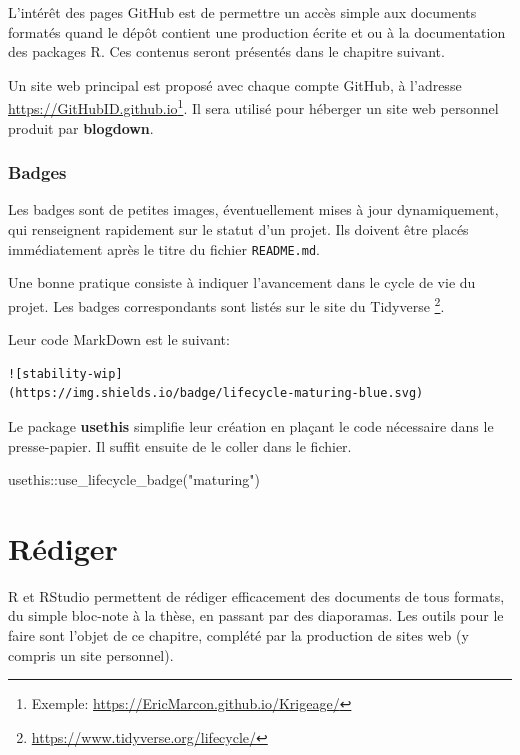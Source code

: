 \documentclass[
  11pt,
  french,
  a4paper,
  extrafontsizes,onecolumn,openright
  ]{memoir}
\newenvironment{Shaded}{\begin{snugshade}}{\end{snugshade}}
\newcommand{\FunctionTok}[1]{\textcolor[rgb]{0.00,0.00,0.00}{#1}}
\newcommand{\NormalTok}[1]{#1}
\newcommand{\SpecialCharTok}[1]{\textcolor[rgb]{0.00,0.00,0.00}{#1}}
\newcommand{\StringTok}[1]{\textcolor[rgb]{0.31,0.60,0.02}{#1}}
\begin{document}
L'intérêt des pages GitHub est de permettre un accès simple aux documents formatés quand le dépôt contient une production écrite et ou à la documentation des packages R.
Ces contenus seront présentés dans le chapitre suivant.

Un site web principal est proposé avec chaque compte GitHub, à l'adresse \url{https://GitHubID.github.io}\footnote{Exemple: \url{https://EricMarcon.github.io/Krigeage/}}.
Il sera utilisé pour héberger un site web personnel produit par \textbf{blogdown}.

\hypertarget{badges}{%
\subsection{Badges}\label{badges}}

Les badges sont de petites images, éventuellement mises à jour dynamiquement, qui renseignent rapidement sur le statut d'un projet.
Ils doivent être placés immédiatement après le titre du fichier \texttt{README.md}.

Une bonne pratique consiste à indiquer l'avancement dans le cycle de vie du projet.
Les badges correspondants sont listés sur le site du Tidyverse \footnote{\url{https://www.tidyverse.org/lifecycle/}}.

Leur code MarkDown est le suivant:

\begin{verbatim}
![stability-wip]
(https://img.shields.io/badge/lifecycle-maturing-blue.svg)
\end{verbatim}

Le package \textbf{usethis} simplifie leur création en plaçant le code nécessaire dans le presse-papier.
Il suffit ensuite de le coller dans le fichier.

\scriptsize

\begin{Shaded}
\begin{Highlighting}[]
\NormalTok{usethis}\SpecialCharTok{::}\FunctionTok{use\_lifecycle\_badge}\NormalTok{(}\StringTok{"maturing"}\NormalTok{)}
\end{Highlighting}
\end{Shaded}

\normalsize

\hypertarget{chap:rediger}{%
\chapter{Rédiger}\label{chap:rediger}}

R et RStudio permettent de rédiger efficacement des documents de tous formats, du simple bloc-note à la thèse, en passant par des diaporamas.
Les outils pour le faire sont l'objet de ce chapitre, complété par la production de sites web (y compris un site personnel).
\end{document}
